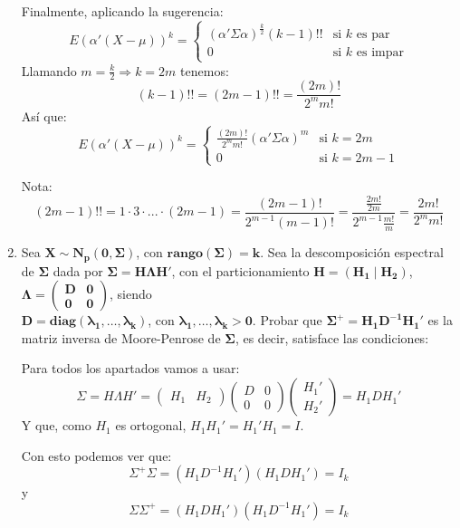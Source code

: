 \documentclass[11pt,a4paper]{article}
\begin{document}
\begin{enumerate}[label=\arabic*.]
Finalmente, aplicando la sugerencia:
$$E(\alpha'(X-\mu))^{k} = \begin{cases}
(\alpha' \Sigma \alpha)^{\frac{k}{2}}(k-1)!! & \text{si } k \text{ es par}\\
0 & \text{si } k \text{ es impar}
\end{cases}$$
Llamando $m = \frac{k}{2} \Rightarrow k = 2m$ tenemos:
$$(k-1)!! = (2m - 1)!! = \frac{(2m)!}{2^{m}m!}$$
Así que:
$$E(\alpha'(X-\mu))^{k} = \begin{cases}
\frac{(2m)!}{2^{m}m!}(\alpha' \Sigma \alpha)^{m} & \text{si } k = 2m \\
0 & \text{si } k = 2m - 1
\end{cases}$$

Nota:
$$(2m-1)!! = 1 \cdot 3 \cdot ... \cdot (2m-1) = \frac{(2m-1)!}{2^{m-1}(m-1)!} = \frac{\frac{2m!}{2m}}{2^{m-1}\frac{m!}{m}} = \frac{2m!}{2^{m}m!}$$

\newpage
\bfseries
\item Sea $\mathbf{X \sim N_{p}(0, \Sigma)}$, con $\mathbf{rango(\Sigma) = k}$. Sea la descomposición espectral de $\mathbf{\Sigma}$ dada por $\mathbf{\Sigma = H \Lambda H'}$, con el particionamiento $\mathbf{H = (H_{1} \mid H_{2})}$, $\mathbf{\Lambda = \begin{pmatrix} \mathbf{D} & \mathbf{0} \\ \mathbf{0} & \mathbf{0} \end{pmatrix}}$, siendo \\ $\mathbf{D = diag(\lambda_{1}, \dots, \lambda_{k})}$, con $\mathbf{\lambda_{1}, \dots, \lambda_{k} > 0}$. Probar que $\mathbf{\Sigma^{+} = H_{1}D^{-1}H_{1}'}$ es la matriz inversa de Moore-Penrose de $\mathbf{\Sigma}$, es decir, satisface las condiciones:
\vspace{0.5cm}
\normalfont

Para todos los apartados vamos a usar:
$$\Sigma = H \Lambda H' = \begin{pmatrix} H_{1} & H_{2} \end{pmatrix} \begin{pmatrix} D & 0 \\ 0 & 0 \end{pmatrix} \begin{pmatrix} H_{1}' \\ H_{2}' \end{pmatrix} = H_{1}DH_{1}'$$
Y que, como $H_{1}$ es ortogonal, $H_{1}H_{1}' = H_{1}'H_{1} = I$.

Con esto podemos ver que:
$$\Sigma^{+}\Sigma = (H_{1}D^{-1}H_{1}') (H_{1}DH_{1}') = I_{k}$$
y
$$\Sigma\Sigma^{+} = (H_{1}DH_{1}') (H_{1}D^{-1}H_{1}') = I_{k}$$


\end{enumerate}
\end{document}
